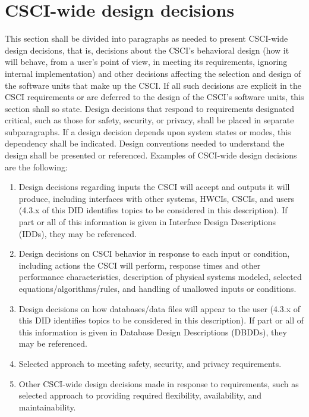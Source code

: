 \documentclass{fidata-report-template}
\begin{document}
\section{CSCI-wide design decisions}

This section shall be divided into paragraphs as needed to present
CSCI-wide design decisions, that is, decisions about the CSCI's
behavioral design (how it will behave, from a user's point of view, in
meeting its requirements, ignoring internal implementation) and other
decisions affecting the selection and design of the software units that
make up the CSCI. If all such decisions are explicit in the CSCI
requirements or are deferred to the design of the CSCI's software units,
this section shall so state. Design decisions that respond to
requirements designated critical, such as those for safety, security, or
privacy, shall be placed in separate subparagraphs. If a design decision
depends upon system states or modes, this dependency shall be indicated.
Design conventions needed to understand the design shall be presented or
referenced. Examples of CSCI-wide design decisions are the following:

\begin{enumerate}
\itemsep1pt\parskip0pt
\item
  Design decisions regarding inputs the CSCI will accept and outputs it
  will produce, including interfaces with other systems, HWCIs, CSCIs,
  and users (4.3.x of this DID identifies topics to be considered in
  this description). If part or all of this information is given in
  Interface Design Descriptions (IDDs), they may be referenced.
\item
  Design decisions on CSCI behavior in response to each input or
  condition, including actions the CSCI will perform, response times and
  other performance characteristics, description of physical systems
  modeled, selected equations/algorithms/rules, and handling of
  unallowed inputs or conditions.
\item
  Design decisions on how databases/data files will appear to the user
  (4.3.x of this DID identifies topics to be considered in this
  description). If part or all of this information is given in Database
  Design Descriptions (DBDDs), they may be referenced.
\item
  Selected approach to meeting safety, security, and privacy
  requirements.
\item
  Other CSCI-wide design decisions made in response to requirements,
  such as selected approach to providing required flexibility,
  availability, and maintainability.
\end{enumerate}
\end{document}
